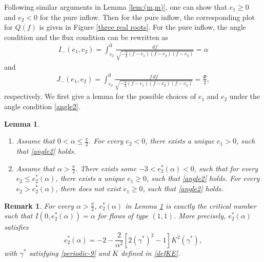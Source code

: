 \documentclass[reqno,12pt]{amsart}
\newtheorem{remark}{Remark}[section]
\newtheorem{lemma}[theorem]{Lemma}
\begin{document}
Following similar arguments in Lemma \ref{lem:(m,m)}, one can show that $e_1 \geq 0$ and $e_2 < 0$ for the pure inflow.  Then for the pure inflow, the corresponding plot for $Q(f)$ is given in  Figure \ref{three real roots}.
For the pure inflow, the angle condition and the flux condition can be rewritten as
\begin{align}\label{angle2}
  I_{-}(e_1, e_2) = \int_{e_2}^0 \frac{df}{\sqrt{-\frac23 (f- e_1)(f-e_2)(f-e_3)}}  = \alpha
\end{align}
and
\begin{align}\label{flux2}
   J_{-}(e_1, e_2)= \int_{e_2}^0 \frac{f \, df }{\sqrt{-\frac23 (f- e_1)(f-e_2)(f-e_3)}}  = \frac{\Phi}{2},
\end{align}
respectively. 
We first give a lemma for the possible choices of $e_1$ and $e_2$ under the angle condition \eqref{angle2}.
\begin{lemma}\label{Lemmapureinflow1}
\begin{enumerate}
\item 
Assume that $0< \alpha \leq  \frac{\pi}{2}$.  For every $e_2<0$, there exists a unique $e_1>0$, such that \eqref{angle2} holds.   
\item 
Assume that $\alpha >  \frac{\pi}{2}$. There exists some $-3<e_2^*(\alpha)<0$, such that for every $e_2 \leq e_2^*(\alpha)$, there exists a unique $e_1\geq 0$, such that \eqref{angle2}  holds. For every $e_2 > e_2^*(\alpha)$, there does not exist $e_1\geq 0$, such that \eqref{angle2} holds. 
\end{enumerate}
\end{lemma}

\begin{remark}
  For every $\alpha > \frac{\pi}{2}$,   $e_2^*(\alpha)$ in Lemma \ref{Lemmapureinflow1} is exactly the critical number such that $I(0, e_2^*(\alpha)) = \alpha$ for flows of type $(1, 1)$. More precisely, $e_2^*(\alpha)$ satisfies 
  \begin{equation*}
 e_2^*(\alpha) = -2 - \frac{2}{\alpha^2} \left[ 2(\gamma^*)^2 -1\right] K^2(\gamma^*), 
  \end{equation*}
  with $\gamma^*$ satisfying \eqref{periodic-9} and $K$ defined in \eqref{defKE}. 
 \end{remark}
\end{document}
